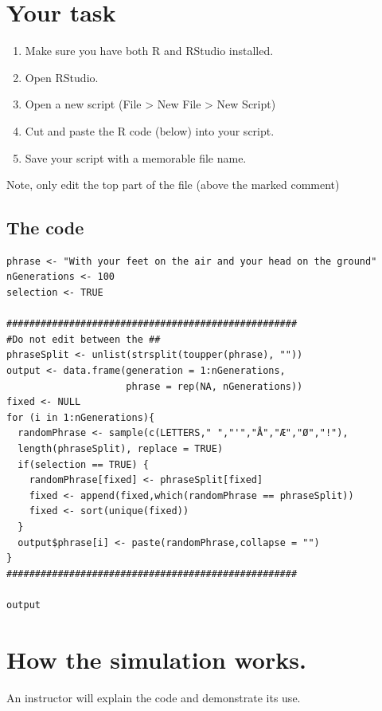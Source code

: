 \documentclass[
  a4paper]{book}
\providecommand{\tightlist}{%
  \setlength{\itemsep}{0pt}\setlength{\parskip}{0pt}}
\begin{document}
\section{Your task}\label{your-task}

\begin{enumerate}
\def\labelenumi{\arabic{enumi}.}
\setcounter{enumi}{-1}
\tightlist
\item
  Make sure you have both R and RStudio installed.
\item
  Open RStudio.
\item
  Open a new script (File \textgreater{} New File \textgreater{} New Script)
\item
  Cut and paste the R code (below) into your script.
\item
  Save your script with a memorable file name.
\end{enumerate}

Note, only edit the top part of the file (above the marked comment)

\subsection{The code}\label{the-code}

\begin{verbatim}
phrase <- "With your feet on the air and your head on the ground"
nGenerations <- 100
selection <- TRUE

###################################################
#Do not edit between the ##
phraseSplit <- unlist(strsplit(toupper(phrase), ""))
output <- data.frame(generation = 1:nGenerations, 
                     phrase = rep(NA, nGenerations))
fixed <- NULL
for (i in 1:nGenerations){
  randomPhrase <- sample(c(LETTERS," ","'","Å","Æ","Ø","!"), 
  length(phraseSplit), replace = TRUE)
  if(selection == TRUE) {
    randomPhrase[fixed] <- phraseSplit[fixed]
    fixed <- append(fixed,which(randomPhrase == phraseSplit))
    fixed <- sort(unique(fixed))
  }
  output$phrase[i] <- paste(randomPhrase,collapse = "")
}
###################################################

output
\end{verbatim}

\section{How the simulation works.}\label{how-the-simulation-works.}

An instructor will explain the code and demonstrate its use.
\end{document}
